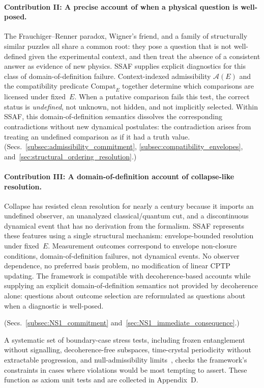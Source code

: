 \documentclass[aps,prx,onecolumn,11pt]{revtex4-2}
\theoremstyle{plain}
\theoremstyle{definition}
\theoremstyle{remark}
\begin{document}
\paragraph{Contribution II: A precise account of when a physical question is
well-posed.}
The Frauchiger--Renner paradox, Wigner's friend, and a family of structurally
similar puzzles all share a common root: they pose a question that is not
well-defined given the experimental context, and then treat the absence of a
consistent answer as evidence of new physics. SSAF supplies explicit diagnostics for this class of domain-of-definition failure. Context-indexed admissibility $\mathcal{A}(E)$ and the
compatibility predicate $\mathrm{Compat}_E$ together determine which
comparisons are licensed under fixed~$E$. When a putative comparison
fails this test, the correct status is \emph{undefined}, not unknown, not
hidden, and not implicitly selected. Within SSAF, this domain-of-definition semantics dissolves the corresponding contradictions without new dynamical postulates: the contradiction arises from treating an undefined comparison as if it had a truth value. (Secs.~\ref{subsec:admissibility_commitment},
\ref{subsec:compatibility_envelopes},
and~\ref{sec:structural_ordering_resolution}.)

\paragraph{Contribution III: A domain-of-definition account of collapse-like resolution.}
Collapse has resisted clean resolution for nearly a century because it imports
an undefined observer, an unanalyzed classical/quantum cut, and a discontinuous
dynamical event that has no derivation from the formalism. SSAF represents these features using a single structural mechanism: envelope-bounded resolution under
fixed~$E$. Measurement outcomes correspond to envelope non-closure
conditions, domain-of-definition failures, not dynamical events. No observer
dependence, no preferred basis problem, no modification of linear CPTP
updating. The framework is compatible with decoherence-based accounts while
supplying an explicit domain-of-definition semantics not provided by
decoherence alone: questions about outcome selection are reformulated
as questions about when a diagnostic is well-posed.

(Secs.~\ref{subsec:NS1_commitment}
and~\ref{sec:NS1_immediate_consequence}.)

A systematic set of boundary-case stress tests, including frozen entanglement
without signalling, decoherence-free subspaces, time-crystal periodicity
without extractable progression, and null-admissibility
limits~\cite{LidarWhaley2003,WatanabeOshikawa2015}, checks the framework’s constraints in cases where violations would be most tempting to assert. These function as axiom unit tests and are collected in
Appendix~D.
\end{document}
